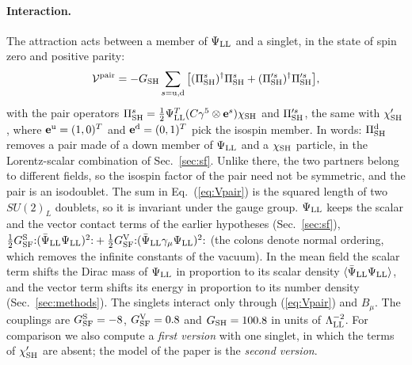 \documentclass[aps,prd,twocolumn,superscriptaddress,nofootinbib,floatfix,longbibliography]{revtex4-2}
\newcommand{\LL}{{\rm LL}}
\newcommand{\SF}{{\rm SF}}
\newcommand{\SH}{{\rm SH}}
\begin{document}
\paragraph*{Interaction.}
The attraction acts between a member of $\Psi_\LL$ and a singlet, in the state of spin zero and positive parity:
\begin{equation}
\mathcal V^{\rm pair}=-G_\SH\sum_{s={\rm u},{\rm d}}\big[(\Pi^s_\SH)^\dagger\Pi^s_\SH+(\Pi'^s_\SH)^\dagger\Pi'^s_\SH\big],
\label{eq:Vpair}
\end{equation}
with the pair operators $\Pi^s_\SH=\frac12\Psi^T_\LL(C\gamma^5\otimes\mathbf e^s)\chi_\SH$ and $\Pi'^s_\SH$, the same with
$\chi'_\SH$, where $\mathbf e^{\rm u}=(1,0)^T$ and $\mathbf e^{\rm d}=(0,1)^T$ pick the isospin member. In words:
$\Pi^{\rm d}_\SH$ removes a pair made of a down member of $\Psi_\LL$ and a $\chi_\SH$ particle, in the Lorentz-scalar
combination of Sec.~\ref{sec:sf}. Unlike there, the two partners belong to different fields, so the isospin factor of
the pair need not be symmetric, and the pair is an isodoublet. The sum in Eq.~(\ref{eq:Vpair}) is the squared length of
two $SU(2)_L$ doublets, so it is invariant under the gauge group. $\Psi_\LL$ keeps the scalar and the vector contact terms
of the earlier hypotheses (Sec.~\ref{sec:sf}), $\frac12G^{\rm S}_\SF{:}(\bar\Psi_\LL\Psi_\LL)^2{:}+\frac12G^{\rm
V}_\SF{:}(\bar\Psi_\LL\gamma_\mu\Psi_\LL)^2{:}$ (the colons denote normal ordering, which removes the infinite constants of
the vacuum). In the mean field the scalar term shifts the Dirac mass of $\Psi_\LL$ in proportion to its scalar density
$\langle\bar\Psi_\LL\Psi_\LL\rangle$, and the vector term shifts its energy in proportion to its number density
(Sec.~\ref{sec:methods}). The singlets interact only through (\ref{eq:Vpair}) and $B_\mu$. The couplings are $G^{\rm S}_\SF=-8$, $G^{\rm V}_\SF=0.8$ and $G_\SH=100.8$ in units of
$\Lambda_\LL^{-2}$. For comparison we also compute a \emph{first version} with one singlet, in which the terms of
$\chi'_\SH$ are absent; the model of the paper is the \emph{second version}.
\end{document}
